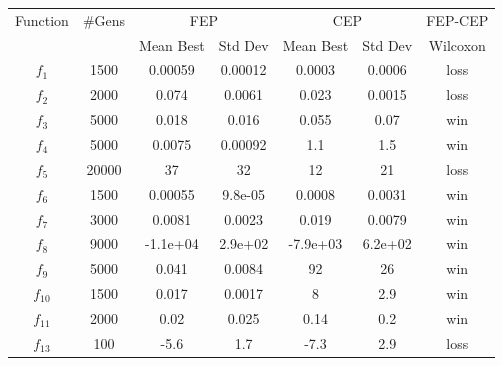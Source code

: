 \begin{table}\scriptsize
\begin{tabular}{ccccccc}
\hline
\multirow{2}{*}{Function} & \multirow{2}{*}{\#Gens}& \multicolumn{2}{c}{FEP} & \multicolumn{2}{c}{CEP} & FEP-CEP \\
 & & Mean Best & Std Dev & Mean Best & Std Dev & Wilcoxon \\
\hline
 $f_{1}$ & 1500 & 0.00059 & 0.00012 & 0.0003 & 0.0006 & loss \\
 $f_{2}$ & 2000 & 0.074 & 0.0061 & 0.023 & 0.0015 & loss \\
 $f_{3}$ & 5000 & 0.018 & 0.016 & 0.055 & 0.07 & win \\
 $f_{4}$ & 5000 & 0.0075 & 0.00092 & 1.1 & 1.5 & win \\
 $f_{5}$ & 20000 & 37 & 32 & 12 & 21 & loss \\
 $f_{6}$ & 1500 & 0.00055 & 9.8e-05 & 0.0008 & 0.0031 & win \\
 $f_{7}$ & 3000 & 0.0081 & 0.0023 & 0.019 & 0.0079 & win \\
 $f_{8}$ & 9000 & -1.1e+04 & 2.9e+02 & -7.9e+03 & 6.2e+02 & win \\
 $f_{9}$ & 5000 & 0.041 & 0.0084 & 92 & 26 & win \\
 $f_{10}$ & 1500 & 0.017 & 0.0017 & 8 & 2.9 & win \\
 $f_{11}$ & 2000 & 0.02 & 0.025 & 0.14 & 0.2 & win \\
 $f_{13}$ & 100 & -5.6 & 1.7 & -7.3 & 2.9 & loss \\
\hline
\end{tabular}
\end{table}
